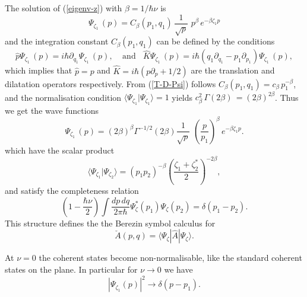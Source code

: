 \documentclass[a4paper,12pt]{article}
\begin{document}
\noindent
The solution of (\ref{eigenv-z}) with $\beta=1/\hbar\nu$ is
\begin{equation}\label{eigenstate-z}
\Psi_{\zeta_1}\,(p)=C_\beta(p_1,q_1)\,\frac{1}{\sqrt p}\,\,
p^{\beta}\,e^{-\beta\zeta_1p}
\end{equation}
and the integration constant $C_\beta (p_1,q_1)$
can be defined by the conditions
 \begin{equation}\label{T-D-Psi}
\hat p\Psi_{\zeta_1}\,(p)= i\hbar\partial_{q_1}\Psi_{\zeta_1}\,(p),
~~~~~\mbox{and}~~~~\hat K\Psi_{\zeta_1}\,(p)=i\hbar(q_1\partial_{q_1}
-p_1\partial_{p_1})\Psi_{\zeta_1}\,(p),
\end{equation}
which implies that $\hat p=p$ and
$\hat K=i\hbar(p\partial_p+1/2)$ are the translation and
dilatation operators respectively.
From (\ref{T-D-Psi}) follows
$C_\beta(p_1,q_1)=c_\beta\,p_1^{-\beta}$,
and the normalisation condition
$\langle \Psi_{\zeta_1}|\Psi_{\zeta_1}\rangle =1$ yields
$c_\beta^2 \,\Gamma(2\beta)\,=(2\beta)^{2\beta}$. Thus we get
the wave functions
\begin{equation}\label{coh-st}
\Psi_{\zeta_1}\,(p)=(2\beta)^{\beta}\Gamma^{-1/2}(2\beta)
\frac{1}{\sqrt p}\,\,
\left(\frac{p}{p_1}\right)^{\beta}\,e^{-\beta\zeta_1p}.
\end{equation}
which have the scalar product
\begin{equation}\label{scalar-pr1}
\langle \Psi_{\zeta_1}|\Psi_{\zeta_2} \rangle=(p_1p_2)^{-\beta}
\left(\frac{\zeta_1+\zeta^*_2}{2}\right)^{-2\beta},
\end{equation}
and satisfy the completeness relation
\begin{equation}\label{complete}
\left(1-\frac{\hbar\nu}{2}\right)
\int \frac{dp\,dq}{2\pi\hbar} \Psi_\zeta^* (p_1)\Psi_\zeta (p_2)=
\delta (p_1-p_2).
\end{equation}
This structure defines the
the Berezin symbol calculus for
\begin{equation}\label{Berezin}
\check A(p,q)=\langle \Psi_{\zeta}|\hat A|\Psi_{\zeta} \rangle.
\end{equation}

\noindent
At $\nu=0$ the coherent states become non-normalisable, like the standard
coherent states on the plane. In particular for $\nu\rightarrow 0$
we have
\begin{equation}\label{nu=0}
|\Psi_{\zeta_1}(p)|^2 \rightarrow \delta(p-p_1).
\end{equation}

\vspace{0.5cm}
\end{document}
